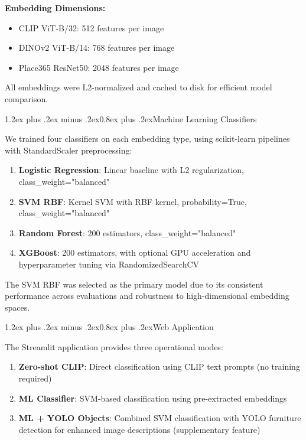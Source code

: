 \documentclass[conference]{IEEEtran}
\makeatletter
\renewcommand{\subsection}{\@startsection{subsection}{2}{\z@}%
  {1.2ex plus .2ex minus .2ex}{0.8ex plus .2ex}{\normalfont\bfseries}}
\makeatother
\begin{document}
\textbf{Embedding Dimensions:}
\begin{itemize}
\item CLIP ViT-B/32: 512 features per image
\item DINOv2 ViT-B/14: 768 features per image
\item Place365 ResNet50: 2048 features per image
\end{itemize}

All embeddings were L2-normalized and cached to disk for efficient model comparison.

\subsection{Machine Learning Classifiers}

We trained four classifiers on each embedding type, using scikit-learn pipelines with StandardScaler preprocessing:

\begin{enumerate}
\item \textbf{Logistic Regression}: Linear baseline with L2 regularization, class\_weight="balanced"
\item \textbf{SVM RBF}: Kernel SVM with RBF kernel, probability=True, class\_weight="balanced"
\item \textbf{Random Forest}: 200 estimators, class\_weight="balanced"
\item \textbf{XGBoost}: 200 estimators, with optional GPU acceleration and hyperparameter tuning via RandomizedSearchCV
\end{enumerate}

The SVM RBF was selected as the primary model due to its consistent performance across evaluations and robustness to high-dimensional embedding spaces.

\subsection{Web Application}

The Streamlit application provides three operational modes:

\begin{enumerate}
\item \textbf{Zero-shot CLIP}: Direct classification using CLIP text prompts (no training required)
\item \textbf{ML Classifier}: SVM-based classification using pre-extracted embeddings
\item \textbf{ML + YOLO Objects}: Combined SVM classification with YOLO furniture detection for enhanced image descriptions (supplementary feature)
\end{enumerate}
\end{document}
